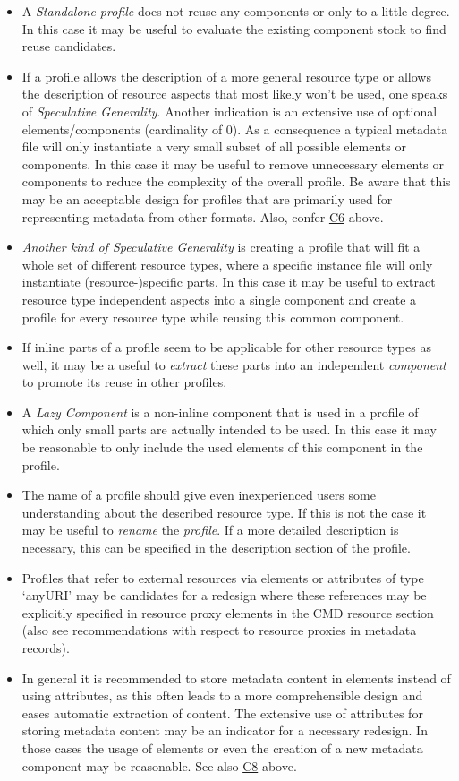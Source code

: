 \begin{itemize}
\tightlist
\item
  A \emph{Standalone profile} does not reuse any components or only to a little degree. In this case it may be useful to evaluate the existing component stock to find reuse candidates.
\item
  If a profile allows the description of a more general resource type or allows the description of resource aspects that most likely won't be used, one speaks of \emph{Speculative Generality}. Another indication
  is an extensive use of optional elements/components (cardinality of 0). As a consequence a typical metadata file will only instantiate a very small subset of all possible elements or components. In this case it may be useful to remove unnecessary elements or components to reduce the complexity of the overall profile. Be aware that this may
  be an acceptable design for profiles that are primarily used for representing metadata from other formats. Also, confer
  \hyperref[c6]{C6} above.
\item
  \emph{Another kind of Speculative Generality} is creating a profile that will fit a whole set of different resource types, where a specific instance file will only instantiate (resource-)specific parts. In this case it may be useful to extract resource type independent aspects into a single component and create a profile for every resource type while reusing this common component.
\item
  If inline parts of a profile seem to be applicable for other resource types as well, it may be a useful to \emph{extract} these parts into an independent \emph{component} to promote its reuse in other profiles.
\item
  A \emph{Lazy Component} is a non-inline component that is used in a profile of which only small parts are actually intended to be used. In this case it may be reasonable to only include the used elements of this component in the profile.
\item
  The name of a profile should give even inexperienced users some understanding about the described resource type. If this is not the case it may be useful to \emph{rename} the \emph{profile}. If a more detailed description is necessary, this can be specified in the description section of the profile.
\item
  Profiles that refer to external resources via elements or attributes of type `anyURI' may be candidates for a redesign where these references may be explicitly specified in resource proxy elements in the CMD resource section (also see recommendations with respect to resource proxies in metadata records).
\item
  In general it is recommended to store metadata content in elements instead of using attributes, as this often leads to a more comprehensible design and eases automatic extraction of content. The extensive use of attributes for storing metadata content may be an indicator for a necessary redesign. In those cases the usage of elements or even the creation of a new metadata component may be reasonable. See also \hyperref[c8]{C8} above.
\end{itemize}

